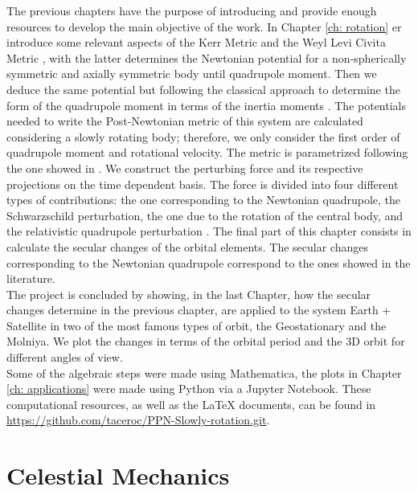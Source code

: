 The previous chapters have the purpose of introducing and provide enough resources to develop the main objective of the work. In Chapter \ref{ch: rotation} er introduce some relevant aspects of the Kerr Metric \cite{Bambi, Frolov, Raine} and the Weyl Levi Civita Metric \cite{johnandcoulter}, with the latter determines the Newtonian potential for a non-spherically symmetric and axially symmetric body until quadrupole moment. Then we deduce the same potential but following the classical approach to determine the form of the quadrupole moment in terms of the inertia moments \cite{Goldstain, GravityPoisson}. The potentials needed to write the Post-Newtonian metric of this system are calculated considering a slowly rotating body; therefore, we only consider the first order of quadrupole moment and rotational velocity. The metric is parametrized following the one showed in \cite{Brumberg}. We construct the perturbing force and its respective projections on the time dependent basis. The force is divided into four different types of contributions: the one corresponding to the Newtonian quadrupole, the Schwarzschild perturbation, the one due to the rotation of the central body, and the relativistic quadrupole perturbation \cite{Brumberg}. The final part of this chapter consists in calculate the secular changes of the orbital elements. The secular changes corresponding to the Newtonian quadrupole correspond to the ones showed in the literature.\\

The project is concluded by showing, in the last Chapter, how  the secular changes determine in the previous chapter, are applied to the system Earth + Satellite in two of the most famous types of orbit, the Geostationary and the Molniya. We plot the changes in terms of the orbital period and the 3D orbit for different angles of view.\\

Some of the algebraic steps were made using Mathematica, the plots in Chapter \ref{ch: applications} were made using Python via a Jupyter Notebook. These computational resources, as well as the \LaTeX  \hspace{0.2cm} documents, can be found in \url{https://github.com/taceroc/PPN-Slowly-rotation.git}.




\chapter{Celestial Mechanics}\label{ch: celestial mechanics}

